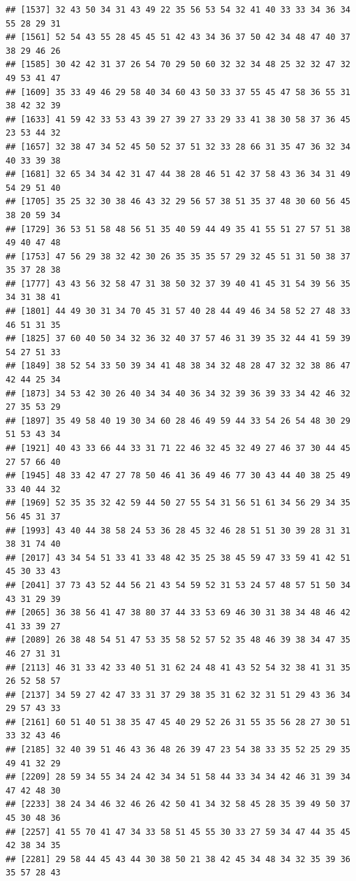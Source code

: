 \documentclass[
]{book}
\begin{document}
\begin{verbatim}
## [1537] 32 43 50 34 31 43 49 22 35 56 53 54 32 41 40 33 33 34 36 34 55 28 29 31
## [1561] 52 54 43 55 28 45 45 51 42 43 34 36 37 50 42 34 48 47 40 37 38 29 46 26
## [1585] 30 42 42 31 37 26 54 70 29 50 60 32 32 34 48 25 32 32 47 32 49 53 41 47
## [1609] 35 33 49 46 29 58 40 34 60 43 50 33 37 55 45 47 58 36 55 31 38 42 32 39
## [1633] 41 59 42 33 53 43 39 27 39 27 33 29 33 41 38 30 58 37 36 45 23 53 44 32
## [1657] 32 38 47 34 52 45 50 52 37 51 32 33 28 66 31 35 47 36 32 34 40 33 39 38
## [1681] 32 65 34 34 42 31 47 44 38 28 46 51 42 37 58 43 36 34 31 49 54 29 51 40
## [1705] 35 25 32 30 38 46 43 32 29 56 57 38 51 35 37 48 30 60 56 45 38 20 59 34
## [1729] 36 53 51 58 48 56 51 35 40 59 44 49 35 41 55 51 27 57 51 38 49 40 47 48
## [1753] 47 56 29 38 32 42 30 26 35 35 35 57 29 32 45 51 31 50 38 37 35 37 28 38
## [1777] 43 43 56 32 58 47 31 38 50 32 37 39 40 41 45 31 54 39 56 35 34 31 38 41
## [1801] 44 49 30 31 34 70 45 31 57 40 28 44 49 46 34 58 52 27 48 33 46 51 31 35
## [1825] 37 60 40 50 34 32 36 32 40 37 57 46 31 39 35 32 44 41 59 39 54 27 51 33
## [1849] 38 52 54 33 50 39 34 41 48 38 34 32 48 28 47 32 32 38 86 47 42 44 25 34
## [1873] 34 53 42 30 26 40 34 34 40 36 34 32 39 36 39 33 34 42 46 32 27 35 53 29
## [1897] 35 49 58 40 19 30 34 60 28 46 49 59 44 33 54 26 54 48 30 29 51 53 43 34
## [1921] 40 43 33 66 44 33 31 71 22 46 32 45 32 49 27 46 37 30 44 45 27 57 66 40
## [1945] 48 33 42 47 27 78 50 46 41 36 49 46 77 30 43 44 40 38 25 49 33 40 44 32
## [1969] 52 35 35 32 42 59 44 50 27 55 54 31 56 51 61 34 56 29 34 35 56 45 31 37
## [1993] 43 40 44 38 58 24 53 36 28 45 32 46 28 51 51 30 39 28 31 31 38 31 74 40
## [2017] 43 34 54 51 33 41 33 48 42 35 25 38 45 59 47 33 59 41 42 51 45 30 33 43
## [2041] 37 73 43 52 44 56 21 43 54 59 52 31 53 24 57 48 57 51 50 34 43 31 29 39
## [2065] 36 38 56 41 47 38 80 37 44 33 53 69 46 30 31 38 34 48 46 42 41 33 39 27
## [2089] 26 38 48 54 51 47 53 35 58 52 57 52 35 48 46 39 38 34 47 35 46 27 31 31
## [2113] 46 31 33 42 33 40 51 31 62 24 48 41 43 52 54 32 38 41 31 35 26 52 58 57
## [2137] 34 59 27 42 47 33 31 37 29 38 35 31 62 32 31 51 29 43 36 34 29 57 43 33
## [2161] 60 51 40 51 38 35 47 45 40 29 52 26 31 55 35 56 28 27 30 51 33 32 43 46
## [2185] 32 40 39 51 46 43 36 48 26 39 47 23 54 38 33 35 52 25 29 35 49 41 32 29
## [2209] 28 59 34 55 34 24 42 34 34 51 58 44 33 34 34 42 46 31 39 34 47 42 48 30
## [2233] 38 24 34 46 32 46 26 42 50 41 34 32 58 45 28 35 39 49 50 37 45 30 48 36
## [2257] 41 55 70 41 47 34 33 58 51 45 55 30 33 27 59 34 47 44 35 45 42 38 34 35
## [2281] 29 58 44 45 43 44 30 38 50 21 38 42 45 34 48 34 32 35 39 36 35 57 28 43

\end{verbatim}
\end{document}
